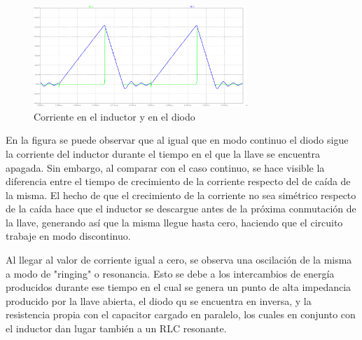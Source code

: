\documentclass[e4_tp1_main.tex]{subfiles}
\begin{document}
	\begin{figure}[H]
		\centering
		\includegraphics[width=0.72\textwidth]{images/ej4/fig3.png}
		\caption{Corriente en el inductor y en el diodo}
		\label{fig:my_label}
	\end{figure}
	
	En la figura se puede observar que al igual que en modo continuo el diodo sigue la corriente del inductor durante el tiempo en el que la llave se encuentra apagada. Sin embargo, al comparar con el caso continuo, se hace visible la diferencia entre el tiempo de crecimiento de la corriente respecto del de caída de la misma. El hecho de que el crecimiento de la corriente no sea simétrico respecto de la caída hace que el inductor se descargue antes de la próxima conmutación de la llave, generando así que la misma llegue hasta cero, haciendo que el circuito trabaje en modo discontinuo.
	
	Al llegar al valor de corriente igual a cero, se observa una oscilación de la misma a modo de "ringing" o resonancia. Esto se debe a los intercambios de energía producidos durante ese tiempo en el cual se genera un punto de alta impedancia producido por la llave abierta, el diodo qu se encuentra en inversa, y la resistencia propia con el capacitor cargado en paralelo, los cuales en conjunto con el inductor dan lugar también a un RLC resonante.
	
\end{document}
